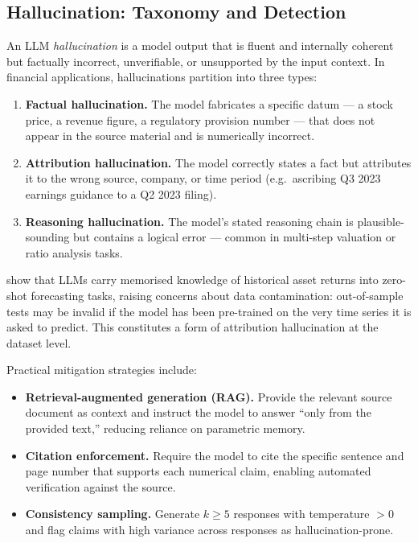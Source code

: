 \begin{deepdive}

\subsection{Hallucination: Taxonomy and Detection}
\label{sec:llm-hallucination}

\begin{definition}
\label{def:hallucination}
An LLM \emph{hallucination} is a model output that is fluent and
internally coherent but factually incorrect, unverifiable, or unsupported
by the input context.  In financial applications, hallucinations partition
into three types:
\begin{enumerate}
  \item \textbf{Factual hallucination.}  The model fabricates a specific
        datum — a stock price, a revenue figure, a regulatory provision
        number — that does not appear in the source material and is
        numerically incorrect.
  \item \textbf{Attribution hallucination.}  The model correctly states
        a fact but attributes it to the wrong source, company, or time
        period (e.g.\ ascribing Q3 2023 earnings guidance to a Q2 2023 filing).
  \item \textbf{Reasoning hallucination.}  The model's stated reasoning
        chain is plausible-sounding but contains a logical error — common
        in multi-step valuation or ratio analysis tasks.
\end{enumerate}
\end{definition}

\citet{didisheim2025memory}
show that LLMs carry memorised knowledge of historical asset returns
into zero-shot forecasting tasks, raising concerns about data contamination:
out-of-sample tests may be invalid if the model has been pre-trained on
the very time series it is asked to predict.  This constitutes a form of
attribution hallucination at the dataset level.

Practical mitigation strategies include:
\begin{itemize}
  \item \textbf{Retrieval-augmented generation (RAG).}  Provide the
        relevant source document as context and instruct the model to
        answer ``only from the provided text,'' reducing reliance on
        parametric memory.
  \item \textbf{Citation enforcement.}  Require the model to cite the
        specific sentence and page number that supports each numerical
        claim, enabling automated verification against the source.
  \item \textbf{Consistency sampling.}  Generate $k \geq 5$ responses
        with temperature $> 0$ and flag claims with high variance across
        responses as hallucination-prone.
\end{itemize}


\end{deepdive}
